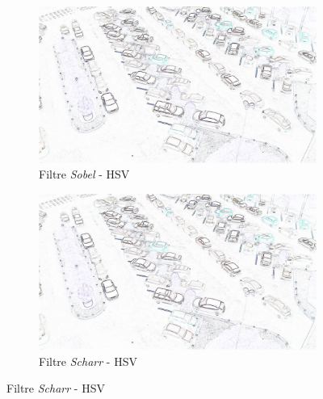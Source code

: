 \begin{figure}[H]
    \bigskip
    \begin{subfigure}{.5\textwidth}
        \centering
        \includegraphics[width=.85\linewidth]{img/conception/image_process/edges_only/1.png}
        \caption{Filtre \textit{Sobel} - HSV}   
    \end{subfigure}%
    \begin{subfigure}{.5\textwidth}
        \centering
        \includegraphics[width=.85\linewidth]{img/conception/image_process/edges_only/4.png}
        \caption{Filtre \textit{Scharr} - HSV}
    \end{subfigure}%
    

\end{figure}
